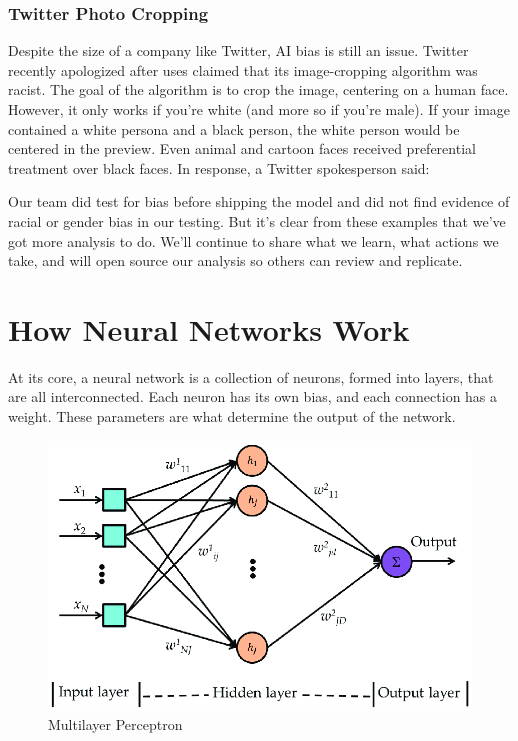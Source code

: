 \documentclass[titlepage]{article}
\begin{document}
\subsubsection{Twitter Photo Cropping}
Despite the size of a company like Twitter, AI bias is still an issue. Twitter recently apologized after uses claimed that its image-cropping algorithm was racist. The goal of the algorithm is to crop the image, centering on a human face. However, it only works if you're white (and more so if you're male). If your image contained a white persona and a black person, the white person would be centered in the preview. Even animal and cartoon faces received preferential treatment over black faces. In response, a Twitter spokesperson said:
\begin{quoting}
    Our team did test for bias before shipping the model and did not find evidence of racial or gender bias in our testing. But it's clear from these examples that we've got more analysis to do. We'll continue to share what we learn, what actions we take, and will open source our analysis so others can review and replicate.
\end{quoting}
\newpage
\section{How Neural Networks Work}
At its core, a neural network is a collection of neurons, formed into layers, that are all interconnected. Each neuron has its own bias, and each connection has a weight. These parameters are what determine the output of the network. 

\begin{figure}[h!]
    \includegraphics[width=\textwidth]{assets/multilayer perceptron.png}
    \caption{Multilayer Perceptron}
    \label{fig:multilayer-perceptron}
\end{figure}
\end{document}
